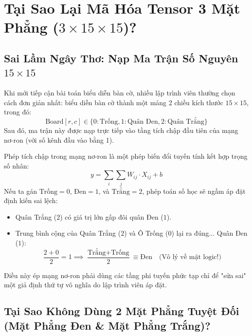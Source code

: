 \documentclass[11pt,a4paper]{report}
\begin{document}
\chapter{Tại Sao Lại Mã Hóa Tensor 3 Mặt Phẳng ($3 \times 15 \times 15$)?}

\section{Sai Lầm Ngây Thơ: Nạp Ma Trận Số Nguyên $15 \times 15$}

Khi mới tiếp cận bài toán biểu diễn bàn cờ, nhiều lập trình viên thường chọn cách đơn giản nhất: biểu diễn bàn cờ thành một mảng 2 chiều kích thước $15 \times 15$, trong đó:
\begin{equation}
    \text{Board}[r, c] \in \{0: \text{Trống}, 1: \text{Quân Đen}, 2: \text{Quân Trắng}\}
\end{equation}
Sau đó, ma trận này được nạp trực tiếp vào tầng tích chập đầu tiên của mạng nơ-ron (với số kênh đầu vào bằng 1).

\begin{tcolorbox}[title={Bệnh lý toán học: Ảo tưởng thứ tự số học (Ordinality Fallacy)}, colframe=alertred]
Phép tích chập trong mạng nơ-ron là một phép biến đổi tuyến tính kết hợp trọng số nhân:
\begin{equation}
    y = \sum_{i} \sum_{j} W_{ij} \cdot X_{ij} + b
\end{equation}
Nếu ta gán $\text{Trống} = 0$, $\text{Đen} = 1$, và $\text{Trắng} = 2$, phép toán số học sẽ ngầm áp đặt định kiến sai lệch:
\begin{itemize}
    \item Quân Trắng ($2$) có giá trị lớn gấp đôi quân Đen ($1$).
    \item Trung bình cộng của Quân Trắng ($2$) và Ô Trống ($0$) lại ra đúng... Quân Đen ($1$):
    \begin{equation}
        \frac{2 + 0}{2} = 1 \implies \frac{\text{Trắng} + \text{Trống}}{2} \equiv \text{Đen} \quad \text{(Vô lý về mặt logic!)}
    \end{equation}
\end{itemize}
Điều này ép mạng nơ-ron phải dùng các tầng phi tuyến phức tạp chỉ để "sửa sai" một giả định thứ tự vô nghĩa do lập trình viên áp đặt.
\end{tcolorbox}

\section{Tại Sao Không Dùng 2 Mặt Phẳng Tuyệt Đối (Mặt Phẳng Đen \& Mặt Phẳng Trắng)?}
\end{document}
